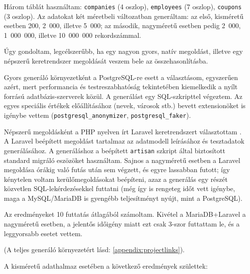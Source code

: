 \documentclass[
    parspace,
    noindent,
    nohyp,
]{elteiktdk}[2023/04/10]
\begin{document}
Három táblát használtam:
\texttt{companies} (4 oszlop),
\texttt{employees} (7 oszlop),
\texttt{coupons} (3 oszlop).
Az adatokat két méretbeli változatban generáltam:
az első, kisméretű esetben 200, 2~000, illetve 5~000;
az második, nagyméretű esetben pedig 2~000, 1~000~000, illetve 10~000~000 rekordszámmal.

Úgy gondoltam, legcélszerűbb,
ha egy nagyon gyors, natív megoldást,
illetve egy népszerű keretrendszer megoldását veszem bele az összehasonlításba.

Gyors generáló környezetként a PostgreSQL-re esett a választásom,
egyszerűen azért, mert performancia és testreszabhatóság tekintetében
kiemelkedik a nyílt forrású adatbázis-szerverek közül.
A generálást egy SQL-szkripttel végeztem.
Az egyes speciális értékek előállításához (nevek, városok stb.)
bevett extensionöket is igénybe vettem
(\texttt{postgresql\_anonymizer}\cite{SoftwarePostgreSqlAnonymizer},
\texttt{postgresql\_faker}\cite{SoftwarePostgreSqlFaker}).

Népszerű megoldásként a PHP nyelven írt Laravel keretrendszert választottam%
\cite{SoftwareLaravel}.
A Laravel beépített megoldást tartalmaz
az adatmodell leírásához és tesztadatok generálásához.
A generáláshoz a beépített \texttt{artisan} szkript által biztosított
standard migráló eszözöket használtam.
Sajnos a nagyméretű esetben a Laravel megoldása órákig való futás után sem végzett,
és egyre lassabban futott;
így kénytelen voltam kerülőmegoldásokat beépíteni,
azaz a generálás egy részét közvetlen SQL-lekérdezésekkel futtatni
(még így is rengeteg időt vett igénybe,
maga a MySQL/MariaDB is gyengébb teljesítményt nyújt, mint a PostgreSQL).

Az eredményeket 10 futtatás átlagából számoltam.
Kivétel a MariaDB+Laravel a nagyméretű esetben,
a jelentős időigény miatt ezt csak 3-szor futtattam le, és a leggyorsabb esetet vettem.

(A teljes generáló környezetért lásd: \autoref{appendix:projectlinks}).

A kisméretű adathalmaz esetében a következő eredmények születtek:
\end{document}
